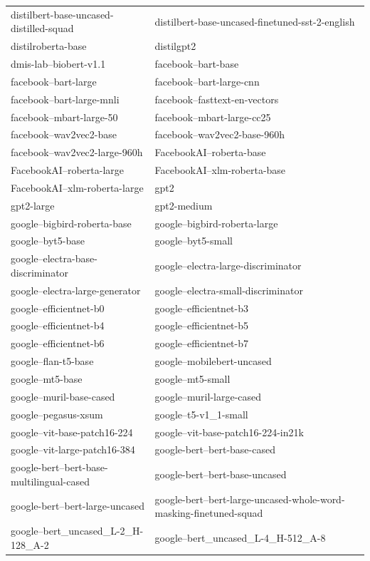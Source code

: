 \documentclass{fairmeta}
\begin{document}
\begin{longtable}{p{} p{}}
distilbert-base-uncased-distilled-squad & distilbert-base-uncased-finetuned-sst-2-english \\
distilroberta-base & distilgpt2 \\
dmis-lab--biobert-v1.1 & facebook--bart-base \\
facebook--bart-large & facebook--bart-large-cnn \\
facebook--bart-large-mnli & facebook--fasttext-en-vectors \\
facebook--mbart-large-50 & facebook--mbart-large-cc25 \\
facebook--wav2vec2-base & facebook--wav2vec2-base-960h \\
facebook--wav2vec2-large-960h & FacebookAI--roberta-base \\
FacebookAI--roberta-large & FacebookAI--xlm-roberta-base \\
FacebookAI--xlm-roberta-large & gpt2 \\
gpt2-large & gpt2-medium \\
google--bigbird-roberta-base & google--bigbird-roberta-large \\
google--byt5-base & google--byt5-small \\
google--electra-base-discriminator & google--electra-large-discriminator \\
google--electra-large-generator & google--electra-small-discriminator \\
google--efficientnet-b0 & google--efficientnet-b3 \\
google--efficientnet-b4 & google--efficientnet-b5 \\
google--efficientnet-b6 & google--efficientnet-b7 \\
google--flan-t5-base & google--mobilebert-uncased \\
google--mt5-base & google--mt5-small \\
google--muril-base-cased & google--muril-large-cased \\
google--pegasus-xsum & google--t5-v1\_1-small \\
google--vit-base-patch16-224 & google--vit-base-patch16-224-in21k \\
google--vit-large-patch16-384 & google-bert--bert-base-cased \\
google-bert--bert-base-multilingual-cased & google-bert--bert-base-uncased \\
google-bert--bert-large-uncased & google-bert--bert-large-uncased-whole-word-masking-finetuned-squad \\
google--bert\_uncased\_L-2\_H-128\_A-2 & google--bert\_uncased\_L-4\_H-512\_A-8 \\

\end{longtable}
\end{document}

